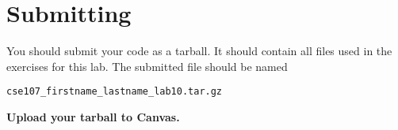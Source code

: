 \documentclass[11pt]{cselabheader}
\begin{document}
\pagebreak
\section{Submitting}
You should submit your code as a tarball. It should contain all files
used in the exercises for this lab. The submitted file should be named
\begin{center}
  \texttt{cse107\_firstname\_lastname\_lab10.tar.gz}
\end{center}

\begin{center}
  \textbf{Upload your tarball to Canvas.}
\end{center}

\listoftheorems
\end{document}
